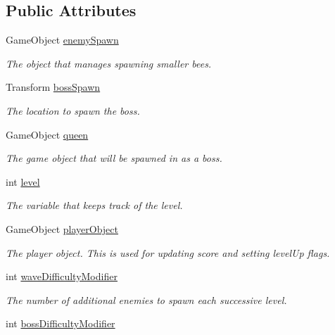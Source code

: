 \subsection*{Public Attributes}
\begin{DoxyCompactItemize}
\item 
Game\+Object \mbox{\hyperlink{class_level_controller_aa449cd525fbc71a079d640241e6ecff3}{enemy\+Spawn}}
\begin{DoxyCompactList}\small\item\em The object that manages spawning smaller bees. \end{DoxyCompactList}\item 
Transform \mbox{\hyperlink{class_level_controller_a986d38f2ec210fe0bd48aae961ebb1a7}{boss\+Spawn}}
\begin{DoxyCompactList}\small\item\em The location to spawn the boss. \end{DoxyCompactList}\item 
Game\+Object \mbox{\hyperlink{class_level_controller_a42fdf92db6ac8eb813e54501476bdc21}{queen}}
\begin{DoxyCompactList}\small\item\em The game object that will be spawned in as a boss. \end{DoxyCompactList}\item 
int \mbox{\hyperlink{class_level_controller_ab3159878c28f1cf902172794006316d2}{level}}
\begin{DoxyCompactList}\small\item\em The variable that keeps track of the level. \end{DoxyCompactList}\item 
Game\+Object \mbox{\hyperlink{class_level_controller_a1999776383f5764862b235ee28106434}{player\+Object}}
\begin{DoxyCompactList}\small\item\em The player object. This is used for updating score and setting level\+Up flags. \end{DoxyCompactList}\item 
int \mbox{\hyperlink{class_level_controller_a7a4d99d10f9128d12efb3b10cdeee921}{wave\+Difficulty\+Modifier}}
\begin{DoxyCompactList}\small\item\em The number of additional enemies to spawn each successive level. \end{DoxyCompactList}\item 
int \mbox{\hyperlink{class_level_controller_aba68593c9e9aa85e67d95232aa91ad0b}{boss\+Difficulty\+Modifier}}

\end{DoxyCompactItemize}
